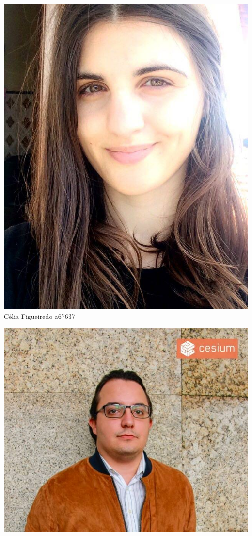 \begin{titlepage}
\begin{center}
\noindent\begin{minipage}[b]{.2\textwidth}
	\includegraphics[scale=0.18]{celia}
	\small{Célia Figueiredo a67637}
\end{minipage} 
\hfill
\begin{minipage}[b]{.2\textwidth}
	\includegraphics[scale=0.3]{luis}

\end{minipage}
\end{center}
\end{titlepage}
